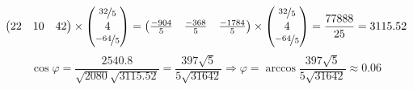 \documentclass{article}
\begin{document}
\begin{center}
$$\begin{pmatrix}
            22 & 10 & 42
        \end{pmatrix}\times\begin{pmatrix}
            \nicefrac{32}{5} \\ 4 \\ \nicefrac{-64}{5}
        \end{pmatrix} = \begin{pmatrix}
            \frac{-904}{5} & \frac{-368}{5} & \frac{-1784}{5}
        \end{pmatrix}\times\begin{pmatrix}
            \nicefrac{32}{5} \\ 4 \\ \nicefrac{-64}{5}
        \end{pmatrix} = \frac{77888}{25} = 3115.52$$
    $$\cos\varphi = \frac{2540.8}{\sqrt{2080}\sqrt{3115.52}} = \frac{397\sqrt{5}}{5\sqrt{31642}} \Rightarrow \varphi = \arccos\frac{397\sqrt{5}}{5\sqrt{31642}} \approx 0.06$$
\end{center}
\end{document}
